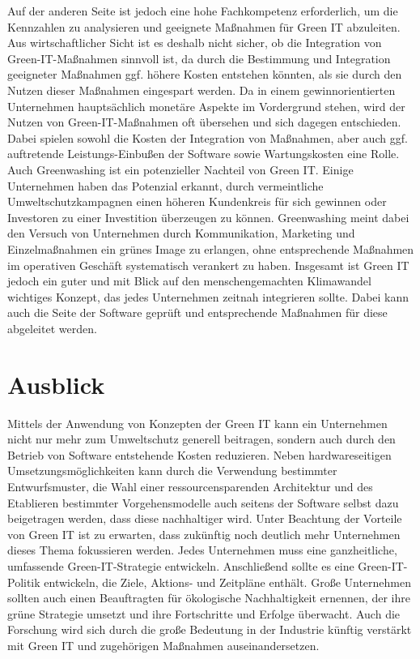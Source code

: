 \documentclass[utf8,biblatex]{lni}
\begin{document}
\newline
Auf der anderen Seite ist jedoch eine hohe Fachkompetenz erforderlich, um die Kennzahlen zu analysieren und geeignete Maßnahmen für Green IT abzuleiten. Aus wirtschaftlicher Sicht ist es deshalb nicht sicher, ob die Integration von Green-IT-Maßnahmen sinnvoll ist, da durch die Bestimmung und Integration geeigneter Maßnahmen ggf. höhere Kosten entstehen könnten, als sie durch den Nutzen dieser Maßnahmen eingespart werden. 
\newline
Da in einem gewinnorientierten Unternehmen hauptsächlich monetäre Aspekte im Vordergrund stehen, wird der Nutzen von Green-IT-Maßnahmen oft übersehen und sich dagegen entschieden. Dabei spielen sowohl die Kosten der Integration von Maßnahmen, aber auch ggf. auftretende Leistungs-Einbußen der Software sowie Wartungskosten eine Rolle.
\newline
Auch Greenwashing ist ein potenzieller Nachteil von Green IT. Einige Unternehmen haben das Potenzial erkannt, durch vermeintliche Umweltschutzkampagnen einen höheren Kundenkreis für sich gewinnen oder Investoren zu einer Investition überzeugen zu können. Greenwashing meint dabei den Versuch von Unternehmen durch Kommunikation, Marketing und Einzelmaßnahmen ein \glqq grünes Image\grqq{} zu erlangen, ohne entsprechende Maßnahmen im operativen Geschäft systematisch verankert zu haben. \cite{LinHi21} 
\newline
\newline
Insgesamt ist Green IT jedoch ein guter und mit Blick auf den menschengemachten Klimawandel wichtiges Konzept, das jedes Unternehmen zeitnah integrieren sollte. Dabei kann auch die Seite der Software geprüft und entsprechende Maßnahmen für diese abgeleitet werden.

\section{Ausblick}
Mittels der Anwendung von Konzepten der Green IT kann ein Unternehmen nicht nur mehr zum Umweltschutz generell beitragen, sondern auch durch den Betrieb von Software entstehende Kosten reduzieren. Neben hardwareseitigen Umsetzungsmöglichkeiten kann durch die Verwendung bestimmter Entwurfsmuster, die Wahl einer ressourcensparenden Architektur und des Etablieren bestimmter Vorgehensmodelle auch seitens der Software selbst dazu beigetragen werden, dass diese nachhaltiger wird. 
\newline
Unter Beachtung der Vorteile von Green IT ist zu erwarten, dass zukünftig noch deutlich mehr Unternehmen dieses Thema fokussieren werden. Jedes Unternehmen muss eine ganzheitliche, umfassende Green-IT-Strategie entwickeln. Anschließend sollte es eine Green-IT-Politik entwickeln, die Ziele, Aktions- und Zeitpläne enthält. Große Unternehmen sollten auch einen Beauftragten für ökologische Nachhaltigkeit ernennen, der ihre grüne Strategie umsetzt und ihre Fortschritte und Erfolge überwacht. \cite{Murugesan08}
\newline
Auch die Forschung wird sich durch die große Bedeutung in der Industrie künftig verstärkt mit Green IT und zugehörigen Maßnahmen auseinandersetzen. 
\newline

\printbibliography
\end{document}
